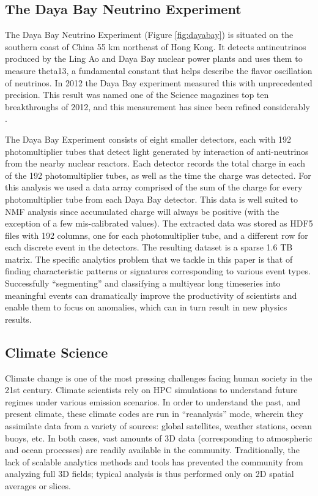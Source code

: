\subsection{The Daya Bay Neutrino Experiment}
The Daya Bay Neutrino Experiment (Figure \ref{fig:dayabay}) is situated on the southern coast of China 55 km northeast of Hong Kong. It detects antineutrinos produced by the Ling Ao and Daya Bay nuclear power plants and uses them to measure theta13, a fundamental constant that helps describe the flavor oscillation of neutrinos. In 2012 the Daya Bay experiment measured this with unprecedented precision. 
This result was named one of the Science magazines top ten breakthroughs of 2012, and this measurement has since been refined considerably \cite{dayabay15}.

The Daya Bay Experiment consists of eight smaller detectors, each with 192 photomultiplier tubes that detect light generated by interaction of anti-neutrinos from the nearby nuclear reactors. Each detector records the total charge in each of the 192 photomultiplier tubes, as well as the time the charge was detected. For this analysis we used a data array comprised of the sum of the charge for every photomultiplier tube from each Daya Bay detector. This data is well suited to NMF analysis since accumulated charge will always be positive (with the exception of a few mis-calibrated values). The extracted data was stored as HDF5 files with 192 columns, one for each photomultiplier tube, and a different row for each discrete event in the detectors. The resulting dataset is a sparse 1.6 TB matrix. The specific analytics problem that we tackle in this paper is that of finding characteristic patterns or signatures corresponding to various event types. Successfully ``segmenting'' and classifying a multiyear long timeseries into meaningful events can dramatically improve the productivity of scientists and enable them to focus on anomalies, which can in turn result in new physics results.

\subsection{Climate Science}

Climate change is one of the most pressing challenges facing human society in the 21st century. Climate scientists rely on HPC simulations to understand future regimes under various emission scenarios. In order to understand the past, and present climate, these climate codes are run in ``reanalysis'' mode, wherein they assimilate data from a variety of sources: global satellites, weather stations, ocean buoys, etc. In both cases, vast amounts of 3D data (corresponding to atmospheric and ocean processes) are readily available in the community. Traditionally, the lack of scalable analytics methods and tools has prevented the community from analyzing full 3D fields; typical analysis is thus performed only on 2D spatial averages or slices. 

